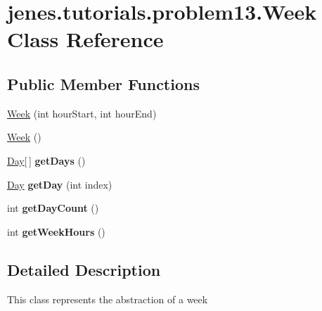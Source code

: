 \hypertarget{classjenes_1_1tutorials_1_1problem13_1_1_week}{\section{jenes.\-tutorials.\-problem13.\-Week Class Reference}
\label{classjenes_1_1tutorials_1_1problem13_1_1_week}
}
\subsection*{Public Member Functions}
\begin{DoxyCompactItemize}
\item 
\hyperlink{classjenes_1_1tutorials_1_1problem13_1_1_week_a26e6636b22cd5bd52d8ca3bc2da7dd23}{Week} (int hour\-Start, int hour\-End)
\item 
\hyperlink{classjenes_1_1tutorials_1_1problem13_1_1_week_a8696d52ddb502e27e97df54f84c1e9cb}{Week} ()
\item 
\hypertarget{classjenes_1_1tutorials_1_1problem13_1_1_week_a5728ac64f649624e6b9c328255963242}{\hyperlink{enumjenes_1_1tutorials_1_1problem13_1_1_day}{Day}\mbox{[}$\,$\mbox{]} {\bfseries get\-Days} ()}\label{classjenes_1_1tutorials_1_1problem13_1_1_week_a5728ac64f649624e6b9c328255963242}

\item 
\hypertarget{classjenes_1_1tutorials_1_1problem13_1_1_week_aaebf833b2be6dc0c2ccd7059be50df82}{\hyperlink{enumjenes_1_1tutorials_1_1problem13_1_1_day}{Day} {\bfseries get\-Day} (int index)}\label{classjenes_1_1tutorials_1_1problem13_1_1_week_aaebf833b2be6dc0c2ccd7059be50df82}

\item 
\hypertarget{classjenes_1_1tutorials_1_1problem13_1_1_week_a759a41dc6fcd4ed880b338b20ebc9ebe}{int {\bfseries get\-Day\-Count} ()}\label{classjenes_1_1tutorials_1_1problem13_1_1_week_a759a41dc6fcd4ed880b338b20ebc9ebe}

\item 
\hypertarget{classjenes_1_1tutorials_1_1problem13_1_1_week_a7837f2861aa105975c74dcc98b707e3e}{int {\bfseries get\-Week\-Hours} ()}\label{classjenes_1_1tutorials_1_1problem13_1_1_week_a7837f2861aa105975c74dcc98b707e3e}

\end{DoxyCompactItemize}


\subsection{Detailed Description}
This class represents the abstraction of a week

